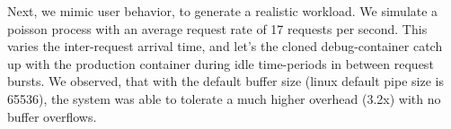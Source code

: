 Next, we mimic user behavior, to generate a realistic workload.
We simulate a poisson process with an average request rate of 17 requests per second. 
This varies the inter-request arrival time, and let's the cloned debug-container catch up with the production container during idle time-periods in between request bursts.
We observed, that with the default buffer size (linux default pipe size is 65536), the system was able to tolerate a much higher overhead (3.2x) with no buffer overflows.



\noindent{}


